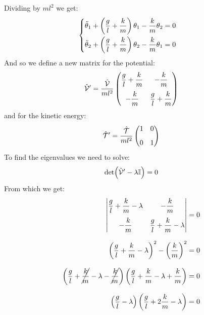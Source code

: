 Dividing by $ml^2$ we get:
\begin{equation} \label{e:ode_system_double_pendulum}
    \begin{cases}
        \ddot{\theta}_1 + \left(\dfrac{g}{l} + \dfrac{k}{m}\right)\theta_1 - \dfrac{k}{m}\theta_2 = 0\\[8pt]
        \ddot{\theta}_2 + \left(\dfrac{g}{l} + \dfrac{k}{m}\right)\theta_2 - \dfrac{k}{m}\theta_1 = 0
    \end{cases}
\end{equation}
And so we define a new matrix for the potential:
\begin{equation}
    \hat{\mathcal{V}}' = \dfrac{\hat{\mathcal{V}}}{ml^2}\begin{pmatrix}
        \dfrac{g}{l} + \dfrac{k}{m} & - \dfrac{k}{m}\\[10pt]
        - \dfrac{k}{m} & \dfrac{g}{l} + \dfrac{k}{m}
    \end{pmatrix}
\end{equation}
and for the kinetic energy:
\begin{equation}
    \hat{\mathcal{T}}' = \dfrac{\hat{\mathcal{T}}}{ml^2}\begin{pmatrix}
        1 & 0\\[8pt]
        0 & 1
    \end{pmatrix}
\end{equation}
To find the eigenvalues we need to solve:
\begin{equation}
    \det(\hat{\mathcal{V}}'-\lambda\mathbb{I}) = 0
\end{equation}
From which we get:
\begin{equation}
    \begin{split}
        \begin{vmatrix}
            \dfrac{g}{l} + \dfrac{k}{m} - \lambda & - \dfrac{k}{m}\\[10pt]
            - \dfrac{k}{m} & \dfrac{g}{l} + \dfrac{k}{m} - \lambda
        \end{vmatrix} &= 0\\[8pt]
        \left(\dfrac{g}{l} + \dfrac{k}{m} - \lambda\right)^2 -\left(\dfrac{k}{m}\right)^2 & = 0\\[8pt]
        \left(\dfrac{g}{l} + \cancel{\dfrac{k}{m}} - \lambda-\cancel{\dfrac{k}{m}}\right)\left(\dfrac{g}{l} + \dfrac{k}{m} - \lambda+\dfrac{k}{m}\right) &=0\\[8pt]
        \left(\dfrac{g}{l} - \lambda\right)\left(\dfrac{g}{l} + 2\dfrac{k}{m} - \lambda\right) &=0
    \end{split}
\end{equation}
